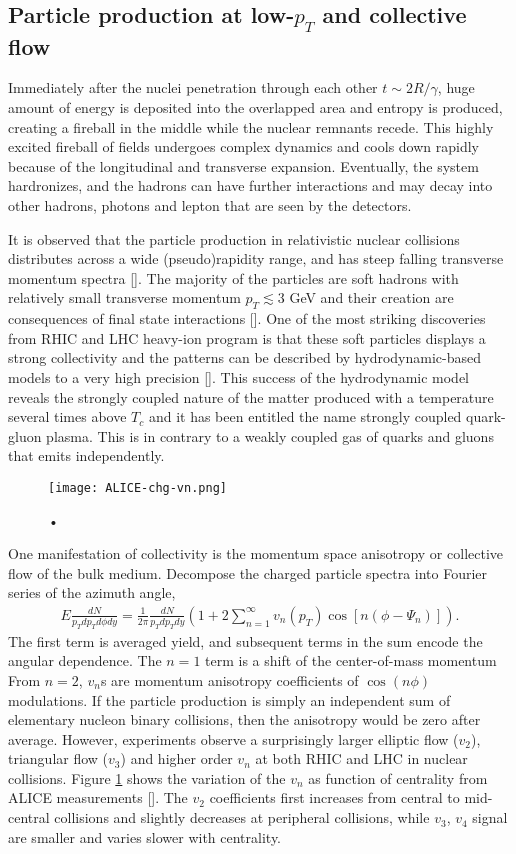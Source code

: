 \subsection{Particle production at low-$p_T$ and collective flow} 
Immediately after the nuclei penetration through each other $t\sim 2R/\gamma$, huge amount of energy is deposited into the overlapped area and entropy is produced, creating a fireball in the middle while the nuclear remnants recede.
This highly excited fireball of fields undergoes complex dynamics and cools down rapidly because of the longitudinal and transverse expansion.
Eventually, the system hardronizes, and the hadrons can have further interactions and may decay into other hadrons, photons and lepton that are seen by the detectors.

It is observed that the particle production in relativistic nuclear collisions distributes across a wide (pseudo)rapidity range, and has steep falling transverse momentum spectra [].
The majority of the particles are soft hadrons with relatively small transverse momentum $p_T \lesssim 3$ GeV and their creation are consequences of final state interactions [].
One of the most striking discoveries from RHIC and LHC heavy-ion program is that these soft particles displays a strong collectivity and the patterns can be described by hydrodynamic-based models to a very high precision [].
This success of the hydrodynamic model reveals the strongly coupled nature of the matter produced with a temperature several times above $T_c$ and it has been entitled the name strongly coupled quark-gluon plasma.
This is in contrary to a weakly coupled gas of quarks and gluons that emits independently.

\begin{figure}
\centering
\texttt{[image: ALICE-chg-vn.png]}
\caption{•}
\label{fig:intro:vn}
\end{figure}

One manifestation of collectivity is the momentum space anisotropy or collective flow of the bulk medium.
Decompose the charged particle spectra into Fourier series of the azimuth angle,
\begin{eqnarray}
E\frac{dN}{p_T dp_T d\phi dy} = \frac{1}{2\pi}\frac{dN}{p_T dp_T dy}\left(1 + 2\sum_{n=1}^{\infty}v_n(p_T)\cos\left[n(\phi-\Psi_n)\right]\right).
\end{eqnarray}
The first term is averaged yield, and subsequent terms in the sum encode the angular dependence. 
The $n=1$ term is a shift of the center-of-mass momentum
From $n=2$, $v_n$s are momentum anisotropy coefficients of $\cos({n\phi})$ modulations.
If the particle production is simply an independent sum of elementary nucleon binary collisions, then the anisotropy would be zero after average. 
However, experiments observe a surprisingly larger elliptic flow ($v_2$), triangular flow ($v_3$) and higher order $v_n$ at both RHIC and LHC in nuclear collisions.
Figure \ref{fig:intro:vn} shows the variation of the $v_n$ as function of centrality from ALICE measurements [].
The $v_2$ coefficients first increases from central to mid-central collisions and slightly decreases at peripheral collisions, while $v_3$, $v_4$ signal are smaller and varies slower with centrality.

